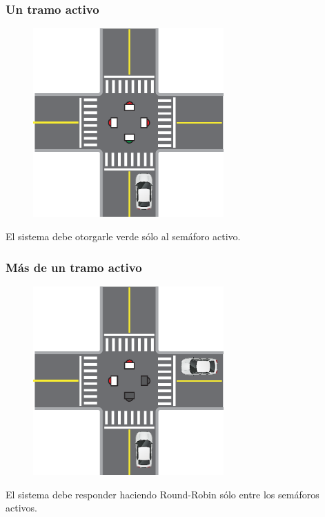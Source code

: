 \begin{frame}
\frametitle{Un tramo activo}
\begin{figure}[htbp]
	\centering
	\includegraphics[width=0.65\textwidth]{diagramas/un-activo.eps}
\end{figure}
El sistema debe otorgarle verde sólo al semáforo activo.
\end{frame}

\begin{frame}
\frametitle{Más de un tramo activo}
\begin{figure}[htbp]
	\centering
	\includegraphics[width=0.65\textwidth]{diagramas/dos-activos.eps}
\end{figure}
El sistema debe responder haciendo Round-Robin sólo entre los semáforos activos.
\end{frame}

